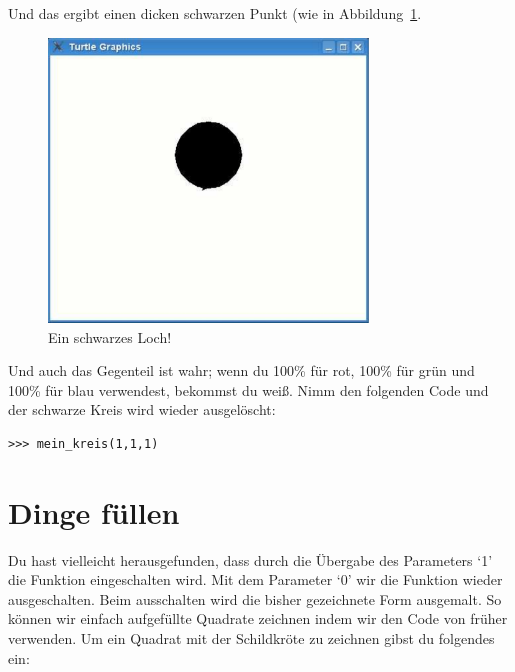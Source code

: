 Und das ergibt einen dicken schwarzen Punkt (wie in Abbildung~\ref{fig25}.

\begin{figure}
\begin{center}
\includegraphics[width=85mm]{images/figure25}
\end{center}
\caption{Ein schwarzes Loch!}\label{fig25}
\end{figure}

Und auch das Gegenteil ist wahr; wenn du 100\% für rot, 100\% für grün und 100\% für blau verwendest, bekommst du weiß. Nimm den folgenden Code und der schwarze Kreis wird wieder ausgelöscht:

\begin{Verbatim}[frame=single]
>>> mein_kreis(1,1,1)
\end{Verbatim}

\section{Dinge füllen}

Du hast vielleicht herausgefunden, dass durch die Übergabe des Parameters `1' die  Funktion eingeschalten wird. Mit dem Parameter `0' wir die Funktion wieder ausgeschalten. Beim ausschalten wird die bisher gezeichnete Form ausgemalt. So können wir einfach aufgefüllte Quadrate zeichnen indem wir den Code von früher verwenden. Um ein Quadrat mit der Schildkröte zu zeichnen gibst du folgendes ein:

